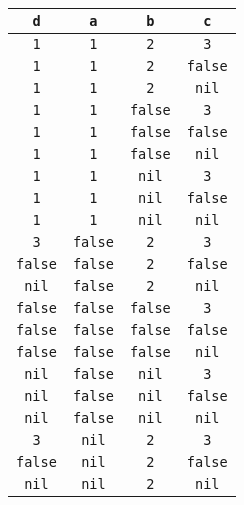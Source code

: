 \begin{table}[H]
    \centering
    \begin{tabular}{|c|c|c|c|}
        \hline
        \texttt{d} & \texttt{a}  & \texttt{b}  & \texttt{c}  \\
        \hline
		\texttt{  1  } & \texttt{  1  } & \texttt{  2  } & \texttt{  3  } \\
		\texttt{  1  } & \texttt{  1  } & \texttt{  2  } & \texttt{false} \\
		\texttt{  1  } & \texttt{  1  } & \texttt{  2  } & \texttt{ nil } \\
		\texttt{  1  } & \texttt{  1  } & \texttt{false} & \texttt{  3  } \\
		\texttt{  1  } & \texttt{  1  } & \texttt{false} & \texttt{false} \\
		\texttt{  1  } & \texttt{  1  } & \texttt{false} & \texttt{ nil } \\
		\texttt{  1  } & \texttt{  1  } & \texttt{ nil } & \texttt{  3  } \\
		\texttt{  1  } & \texttt{  1  } & \texttt{ nil } & \texttt{false} \\
		\texttt{  1  } & \texttt{  1  } & \texttt{ nil } & \texttt{ nil } \\
		\texttt{  3  } & \texttt{false} & \texttt{  2  } & \texttt{  3  } \\
		\texttt{false} & \texttt{false} & \texttt{  2  } & \texttt{false} \\
		\texttt{ nil } & \texttt{false} & \texttt{  2  } & \texttt{ nil } \\
		\texttt{false} & \texttt{false} & \texttt{false} & \texttt{  3  } \\
		\texttt{false} & \texttt{false} & \texttt{false} & \texttt{false} \\
		\texttt{false} & \texttt{false} & \texttt{false} & \texttt{ nil } \\
		\texttt{ nil } & \texttt{false} & \texttt{ nil } & \texttt{  3  } \\
		\texttt{ nil } & \texttt{false} & \texttt{ nil } & \texttt{false} \\
		\texttt{ nil } & \texttt{false} & \texttt{ nil } & \texttt{ nil } \\
		\texttt{  3  } & \texttt{ nil } & \texttt{  2  } & \texttt{  3  } \\
		\texttt{false} & \texttt{ nil } & \texttt{  2  } & \texttt{false} \\
		\texttt{ nil } & \texttt{ nil } & \texttt{  2  } & \texttt{ nil } \\

\end{tabular}
\end{table}
